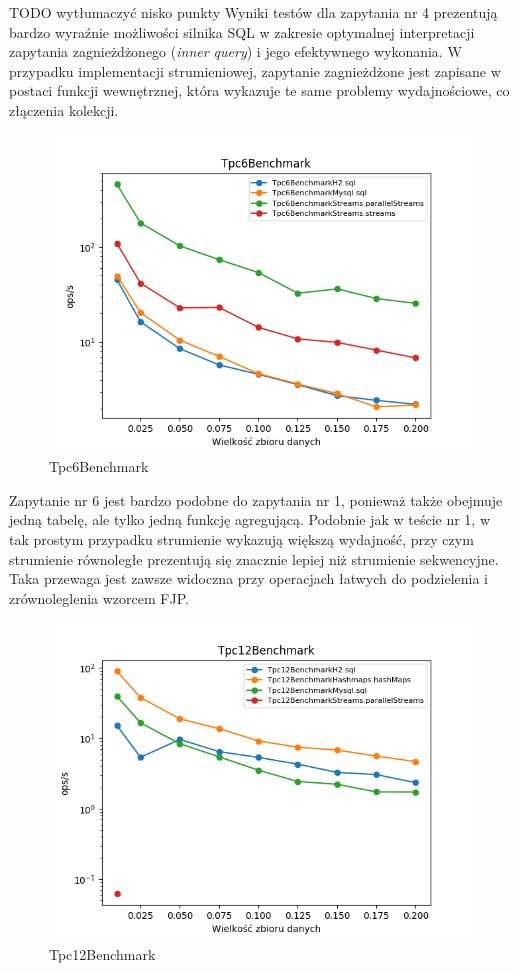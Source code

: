 \documentclass[12pt,twoside,openright]{extarticle}
\begin{document}
TODO wytłumaczyć nisko punkty
    Wyniki testów dla zapytania nr 4 prezentują bardzo wyraźnie możliwości silnika SQL w zakresie optymalnej interpretacji zapytania zagnieżdżonego (\textit{inner query}) i jego efektywnego wykonania. W przypadku implementacji strumieniowej, zapytanie zagnieżdżone jest zapisane w postaci funkcji wewnętrznej, która wykazuje te same problemy wydajnościowe, co złączenia kolekcji. 

\newpage
\begin{figure}[H]
\centering
\includegraphics[width=15cm]{plots/Tpc6Benchmark}
\caption{Tpc6Benchmark}
\end{figure}

    Zapytanie nr 6 jest bardzo podobne do zapytania nr 1, ponieważ także obejmuje jedną tabelę, ale tylko jedną funkcję agregującą. Podobnie jak w teście nr 1, w tak prostym przypadku strumienie wykazują większą wydajność, przy czym strumienie równoległe prezentują się znacznie lepiej niż strumienie sekwencyjne. Taka przewaga jest zawsze widoczna przy operacjach łatwych do podzielenia i zrównoleglenia wzorcem FJP.

\newpage
\begin{figure}[H]
\centering
\includegraphics[width=15cm]{plots/Tpc12Benchmark}
\caption{Tpc12Benchmark}
\end{figure}
\end{document}
